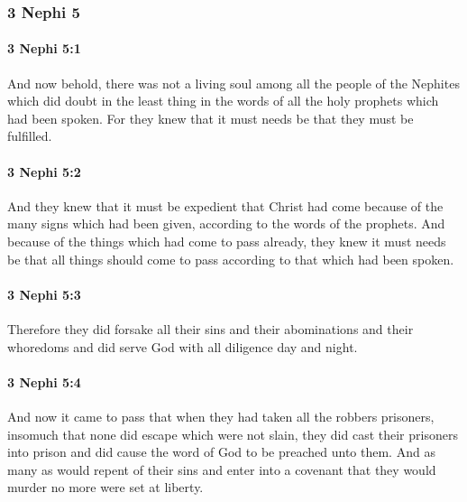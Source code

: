 	\subsubsection{3 Nephi 5} %
		\label{3NEPHI-5}
		
		\paragraph{3 Nephi 5:1} %
			\label{3NEPHI-5-1}

			And now behold, there was not a living soul among all the people of the Nephites
			which did doubt in the least thing
			in the words of all the holy prophets which had been spoken.
			For they knew that it must needs be that they must be fulfilled.

		\paragraph{3 Nephi 5:2} %
			\label{3NEPHI-5-2}

			And they knew that it must be expedient that Christ had come
			because of the many signs which had been given,
			according to the words of the prophets.
			And because of the things which had come to pass already,
			they knew it must needs be that all things should come to pass
			according to that which had been spoken.

		\paragraph{3 Nephi 5:3} %
			\label{3NEPHI-5-3}

			Therefore they did forsake all their sins
			and their abominations and their whoredoms
			and did serve God with all diligence day and night.

		\paragraph{3 Nephi 5:4} %
			\label{3NEPHI-5-4}

			And now it came to pass that when they had taken all the robbers prisoners,
			insomuch that none did escape which were not slain,
			they did cast their prisoners into prison
			and did cause the word of God to be preached unto them.
			And as many as would repent of their sins
			and enter into a covenant that they would murder no more
			were set at liberty.

